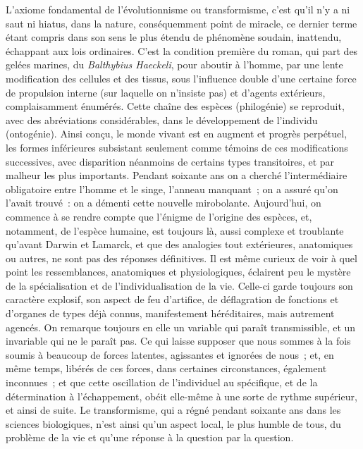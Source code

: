 \documentclass[french,twoside]{book} %
\begin{document}
L’axiome fondamental de l’évolutionnisme ou transformisme, c’est qu’il n’y a ni saut ni hiatus, dans la nature, conséquemment point de miracle, ce dernier terme étant compris dans son sens le plus étendu de phénomène soudain, inattendu, échappant aux lois ordinaires. C’est la condition première du roman, qui part des gelées marines, du {\itshape Balthybius Haeckeli}, pour aboutir à l’homme, par une lente modification des cellules et des tissus, sous l’influence double d’une certaine force de propulsion interne (sur laquelle on n’insiste pas) et d’agents extérieurs, complaisamment énumérés. Cette chaîne des espèces (philogénie) se reproduit, avec des abréviations considérables, dans le développement de l’individu (ontogénie). Ainsi conçu, le monde vivant est en augment et progrès perpétuel, les formes inférieures subsistant seulement comme témoins de ces modifications successives, avec disparition néanmoins de certains types transitoires, et par malheur les plus importants. Pendant soixante ans on a cherché l’intermédiaire obligatoire entre l’homme et le singe, l’anneau manquant ; on a assuré qu’on l’avait trouvé : on a démenti cette nouvelle mirobolante. Aujourd’hui, on commence à se rendre compte que l’énigme de l’origine des espèces, et, notamment, de l’espèce humaine, est toujours là, aussi complexe et troublante qu’avant Darwin et Lamarck, et que des analogies tout extérieures, anatomiques ou autres, ne sont pas des réponses définitives. Il est même curieux de voir à quel point les ressemblances, anatomiques et physiologiques, éclairent peu le mystère de la spécialisation et de l’individualisation de la vie. Celle-ci garde toujours son caractère explosif, son aspect de feu d’artifice, de déflagration de fonctions et d’organes de types déjà connus, manifestement héréditaires, mais autrement agencés. On remarque toujours en elle un variable qui paraît transmissible, et un invariable qui ne le paraît pas. Ce qui laisse supposer que nous sommes à la fois soumis à beaucoup de forces latentes, agissantes et ignorées de nous ; et, en même temps, libérés de ces forces, dans certaines circonstances, également inconnues ; et que cette oscillation de l’individuel au spécifique, et de la détermination à l’échappement, obéit elle-même à une sorte de rythme supérieur, et ainsi de suite. Le transformisme, qui a régné pendant soixante ans dans les sciences biologiques, n’est ainsi qu’un aspect local, le plus humble de tous, du problème de la vie et qu’une réponse à la question par la question.\par
\end{document}
